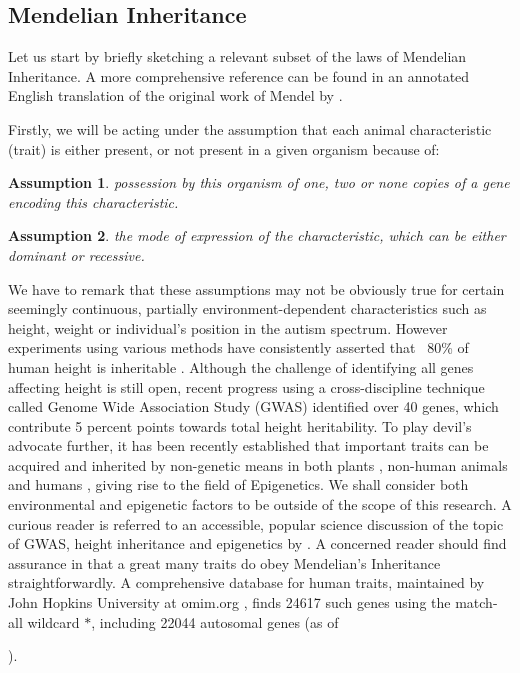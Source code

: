 \documentclass{l4proj}
\newtheorem{assum}{Assumption}
\begin{document}
\subsection{Mendelian Inheritance}

Let us start by briefly sketching a relevant subset of the laws of Mendelian Inheritance. A more comprehensive reference can be found in an annotated English translation of the original work of Mendel by \cite{mendel}.

Firstly, we will be acting under the assumption that each animal characteristic (trait) is either present, or not present in a given organism because of:
\begin{assum}\label{genotypes}
  possession by this organism of one, two or none copies of a gene encoding this characteristic.
\end{assum}

\begin{assum}\label{dominance}
  the mode of expression of the characteristic, which can be either dominant or recessive.
\end{assum}

We have to remark that these assumptions may not be obviously true for certain seemingly continuous, partially environment-dependent characteristics such as height, weight or individual's position in the autism spectrum. However experiments using various methods have consistently asserted that ~80\% of human height is inheritable \parencite{heightTwins, heightJustSiblings}. Although the challenge of identifying all genes affecting height is still open, recent progress using a cross-discipline technique called Genome Wide Association Study (GWAS) identified over 40 genes, which contribute 5 percent points towards total height heritability. To play devil's advocate further, it has been recently established that important traits can be acquired and inherited by non-genetic means in both plants \parencite{palmOilKernel}, non-human animals \parencite{dolinoy_maternal_2007} and humans \parencite{yehuda_holocaust_2015}, giving rise to the field of Epigenetics. We shall consider both environmental and epigenetic factors to be outside of the scope of this research. A curious reader is referred to an accessible, popular science discussion of the topic of GWAS, height inheritance and epigenetics by \textcite{GWASDiscussion}. A concerned reader should find assurance in that a great many traits do obey Mendelian's Inheritance straightforwardly. A comprehensive database for human traits, maintained by John Hopkins University at omim.org \parencite{omim16}, finds 24617 such genes using the match-all wildcard $*$, including 22044 \gls{autosomal} genes (as of \date{March 13, 2016}).
\end{document}
